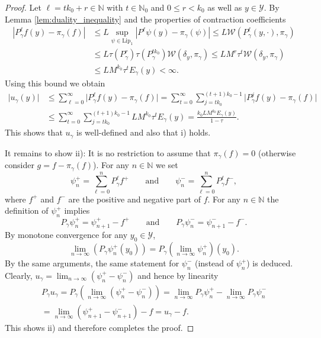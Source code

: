 \documentclass[12pt]{article}
\theoremstyle{definition}
\newcommand{\N}{\mathbb{N}}
\newcommand{\cY}{\mathcal{Y}}
\begin{document}
\begin{proof}
	Let $\ell = tk_0 +r \in \N$ with $t \in \N_0$ and $0 \leq r < k_0$ as well as $y \in \cY$. 
	By Lemma \ref{lem:duality_inequality} and the properties of contraction coefficients   
	\begin{align*}
		\left\vert P_\gamma^\ell f(y) - \pi_\gamma(f)  \right\vert &\leq L \sup_{\psi \in \text{Lip}_1}\left\vert P^\ell \psi(y) - \pi_\gamma(\psi) \right\vert 
		\le L  \mathcal{W}(P_\gamma^{\ell}(y, \cdot), \pi_\gamma ) \\
		&\leq L \tau(P_\gamma^r) \tau(P_\gamma^{tk_0}) \mathcal{W}(\delta_y, \pi_\gamma)
		\leq L M^r \tau^{t} \mathcal{W}(\delta_y, \pi_\gamma) \\
		&\leq L M^{k_0} \tau^{t} E_\gamma(y) < \infty.
	\end{align*}
	Using this bound we obtain 
	\begin{align*}
		\vert u_\gamma(y )\vert  &\le \sum_{\ell=0}^\infty \vert P_\gamma^\ell f(y) - \pi_\gamma(f) \vert =
		\sum_{t=0}^\infty \sum_{j= tk_0 }^{(t+1) k_0-1 } \vert P_\gamma^{j} f(y) - \pi_\gamma(f) \vert\\
		&\leq \sum_{t=0}^\infty \sum_{j= tk_0 }^{(t+1)k_0 -1} L M^{k_0} \tau^{t} E_\gamma(y) 
		= \frac{k_0L M^{k_0} E_\gamma(y)}{1- \tau}.
	\end{align*}
	This shows that $u_\gamma$ is well-defined and also that i) holds. 
	
	
	It remains to show ii): 
	It is no restriction to assume that $\pi_\gamma (f) =0$ (otherwise consider $g = f- \pi_\gamma(f)$). 
	For any $n \in \N$ we set 
	\[
	\psi_n^+ = \sum_{\ell=0}^n P^\ell_\gamma f^+  \qquad\text{and}\qquad \psi_n^- = \sum_{\ell=0}^n P_\gamma^\ell f^-,
	\]
	where $f^+$ and $f^-$ are the positive and negative part of $f$. 
	For any $n \in \N$  the definition of $\psi_n^+$ implies
	\[
	P_\gamma \psi_n^+ = \psi_{n+1}^+ - f^+ \qquad\text{and}\qquad P_\gamma \psi_n^- = \psi_{n+1}^- - f^-.
	\]
	By monotone convergence for any $y_0 \in \cY$, 
	\[
	\lim_{n \to \infty} \left( P_\gamma \psi_n^+ (y_0) \right) = P_\gamma \left( \lim_{n \to \infty} \psi_n^+\right)  (y_0).
	\]
	By the same arguments, the same statement for $\psi_n^-$ (instead of $\psi_n^+$) is deduced.
	Clearly, $u_\gamma = \lim_{n \to \infty} (\psi_n^+ - \psi_n^-)$ and hence by linearity 
	\begin{align*}
		P_\gamma u_\gamma = P_\gamma \left( \lim_{n \to \infty} (\psi_n^+ - \psi_n^-) \right) = \lim_{n \to \infty} P_\gamma \psi_n^+  - \lim_{n \to \infty} P_\gamma \psi_n^- \\
		= \lim_{n \to \infty} \left(\psi_{n+1}^+ - \psi_{n+1}^-\right) - f
		= u_\gamma -f.
	\end{align*}
	This shows ii) and therefore completes the proof.
\end{proof}
\end{document}
